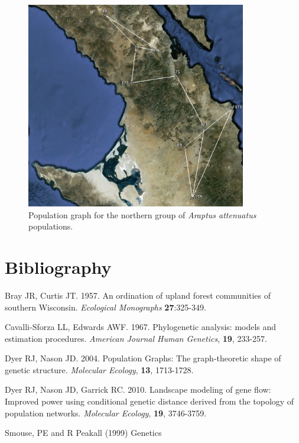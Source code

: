 \documentclass[letterpaper,twoside,openany]{book}
\begin{document}
\begin{figure}[h]
	\centering
	\includegraphics{baja_graph}
	\caption{Population graph for the northern group of \emph{Araptus attenuatus} populations.}
	\label{fig:baja.graph}
\end{figure}


\backmatter

\chapter{Bibliography}

Bray JR, Curtis JT.  1957.  An ordination of upland forest communities of southern Wisconsin. \emph{Ecological Monographs} {\bf 27}:325-349.

Cavalli-Sforza LL, Edwards AWF. 1967. Phylogenetic analysis: models and estimation procedures. \emph{American Journal Human Genetics}, \textbf{19}, 233-257.

Dyer RJ, Nason JD. 2004.  Population Graphs: The graph-theoretic shape of genetic structure. \emph{ Molecular Ecology}, \textbf{13}, 1713-1728.

Dyer RJ, Nason JD, Garrick RC.  2010.  Landscape modeling of gene flow: Improved power using conditional genetic distance derived from the topology of population networks.  \emph{Molecular Ecology}, \textbf{19}, 3746-3759.

Smouse, PE and R Peakall (1999)  Genetics

\printindex
\end{document}

